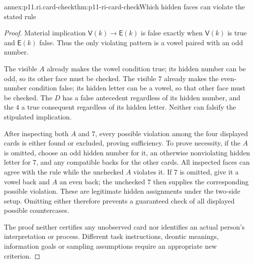 \begin{annexitem}{annex:p11.ri.card-check}{thm:p11-ri-card-check}{Which hidden faces can violate the stated rule}
\begin{proof}
Material implication \(\mathsf V(k)\to\mathsf E(k)\) is false
exactly when \(\mathsf V(k)\) is true and \(\mathsf E(k)\)
false. Thus the only violating pattern is a vowel paired with
an odd number.

The visible \(A\) already makes the vowel condition true;
its hidden number can be odd, so its other face must be checked.
The visible \(7\) already makes the even-number condition false;
its hidden letter can be a vowel, so that other face must be checked.
The \(D\) has a false antecedent regardless of its hidden number,
and the \(4\) a true consequent regardless of its hidden letter.
Neither can falsify the stipulated implication.

After inspecting both \(A\) and \(7\), every possible violation
among the four displayed cards is either found or excluded, proving
sufficiency. To prove necessity, if the \(A\) is omitted, choose
an odd hidden number for it, an otherwise nonviolating hidden
letter for \(7\), and any compatible backs for the other cards.
All inspected faces can agree with the rule while the unchecked
\(A\) violates it. If \(7\) is omitted, give it a vowel back
and \(A\) an even back; the unchecked \(7\) then supplies
the corresponding possible violation. These are legitimate hidden
assignments under the two-side setup. Omitting either therefore
prevents a guaranteed check of all displayed possible countercases.

The proof neither certifies any unobserved card nor identifies
an actual person's interpretation or process. Different task
instructions, deontic meanings, information goals or sampling
assumptions require an appropriate new criterion.
\end{proof}
\end{annexitem}
